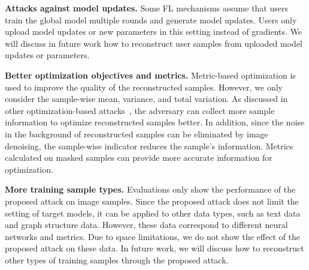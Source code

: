 \documentclass[lettersize,journal]{IEEEtran}
\begin{document}
\begin{appendices}
\textbf{Attacks against model updates.}
Some FL mechanisms assume that users train the global model multiple rounds and generate model updates. Users only upload model updates or new parameters in this setting instead of gradients. We will discuss in future work how to reconstruct user samples from uploaded model updates or parameters.

\textbf{Better optimization objectives and metrics.}
Metric-based optimization is used to improve the quality of the reconstructed samples. However, we only consider the sample-wise mean, variance, and total variation. As discussed in other optimization-based attacks~\cite{jeon2021gradient, Yin2021see}, the adversary can collect more sample information to optimize reconstructed samples better. In addition, since the noise in the background of reconstructed samples can be eliminated by image denoising, the sample-wise indicator reduces the sample's information. Metrics calculated on masked samples can provide more accurate information for optimization.

\textbf{More training sample types.}
Evaluations only show the performance of the proposed attack on image samples. Since the proposed attack does not limit the setting of target models, it can be applied to other data types, such as text data and graph structure data. However, these data correspond to different neural networks and metrics. Due to space limitations, we do not show the effect of the proposed attack on these data. In future work, we will discuss how to reconstruct other types of training samples through the proposed attack.

\end{appendices}
\end{document}
